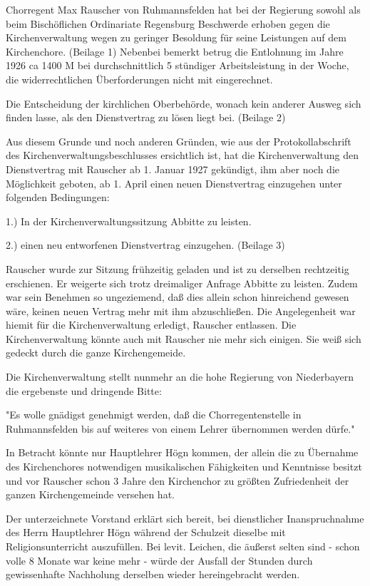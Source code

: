 \documentclass{book}
\begin{document}
Chorregent Max Rauscher von Ruhmannsfelden hat bei der Regierung sowohl als beim
Bischöflichen Ordinariate Regensburg Beschwerde erhoben gegen die
Kirchenverwaltung wegen zu geringer Besoldung für seine Leistungen auf dem
Kirchenchore. (Beilage 1) Nebenbei bemerkt betrug die Entlohnung im Jahre 1926
ca 1400 M bei durchschnittlich 5 stündiger Arbeitsleistung in der Woche, die
widerrechtlichen Überforderungen nicht mit eingerechnet.

Die Entscheidung der kirchlichen Oberbehörde, wonach kein anderer Ausweg sich
finden lasse, als den Dienstvertrag zu lösen liegt bei. (Beilage 2)

Aus diesem Grunde und noch anderen Gründen, wie aus der Protokollabschrift des
Kirchenverwaltungsbeschlusses ersichtlich ist, hat die Kirchenverwaltung den
Dienstvertrag mit Rauscher ab 1. Januar 1927 gekündigt, ihm aber noch die
Möglichkeit geboten, ab 1. April einen neuen Dienstvertrag einzugehen unter
folgenden Bedingungen:

    1.) In der Kirchenverwaltungssitzung Abbitte zu leisten.

    2.) einen neu entworfenen Dienstvertrag einzugehen. (Beilage 3)

Rauscher wurde zur Sitzung frühzeitig geladen und ist zu derselben rechtzeitig
erschienen. Er weigerte sich trotz dreimaliger Anfrage Abbitte zu leisten. Zudem
war sein Benehmen so ungeziemend, daß dies allein schon hinreichend gewesen
wäre, keinen neuen Vertrag mehr mit ihm abzuschließen. Die Angelegenheit war
hiemit für die Kirchenverwaltung erledigt, Rauscher entlassen. Die
Kirchenverwaltung könnte auch mit Rauscher nie mehr sich einigen. Sie weiß sich
gedeckt durch die ganze Kirchengemeide.

Die Kirchenverwaltung stellt nunmehr an die hohe Regierung von Niederbayern die
ergebenste und dringende Bitte:

"Es wolle gnädigst genehmigt werden, daß die Chorregentenstelle in
Ruhmannsfelden bis auf weiteres von einem Lehrer übernommen werden dürfe."

In Betracht könnte nur Hauptlehrer Högn kommen, der allein die zu Übernahme des
Kirchenchores notwendigen musikalischen Fähigkeiten und Kenntnisse besitzt und
vor Rauscher schon 3 Jahre den Kirchenchor zu größten Zufriedenheit der ganzen
Kirchengemeinde versehen hat.

Der unterzeichnete Vorstand erklärt sich bereit, bei dienstlicher
Inanspruchnahme des Herrn Hauptlehrer Högn während der Schulzeit dieselbe mit
Religionsunterricht auszufüllen. Bei levit. Leichen, die äußerst selten sind -
schon volle 8 Monate war keine mehr - würde der Ausfall der Stunden durch
gewissenhafte Nachholung derselben wieder hereingebracht werden.
\end{document}
